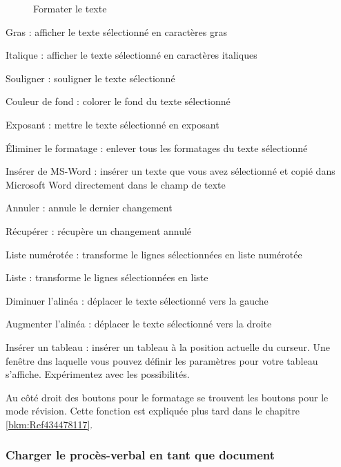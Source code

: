 \begin{figure}[H]
\caption{Formater le texte}
\end{figure}

\begin{compactitem}
\item Gras : afficher le texte sélectionné en caractères gras
\item Italique : afficher le texte sélectionné en caractères italiques
\item Souligner : souligner le texte sélectionné
\item Couleur de fond : colorer le fond du texte sélectionné 
\item Exposant : mettre le texte sélectionné en exposant
\item Éliminer le formatage : enlever tous les formatages du texte sélectionné
\item Insérer de MS-Word : insérer un texte que vous avez sélectionné et copié dans 
Microsoft Word directement dans le champ de texte
\item Annuler : annule le dernier changement
\item Récupérer : récupère un changement annulé
\item Liste numérotée : transforme le lignes sélectionnées 
en liste numérotée
\item Liste : transforme le lignes sélectionnées 
en liste
\item Diminuer l'alinéa : déplacer le texte sélectionné vers la gauche
\item Augmenter l'alinéa : déplacer le texte sélectionné vers la droite
\item Insérer un tableau : insérer un tableau à la position actuelle du curseur.
Une fenêtre dns laquelle vous pouvez définir les paramètres pour votre tableau s'affiche.
Expérimentez avec les possibilités.
\end{compactitem}

\vspace{\baselineskip}

\begin{sloppypar}
Au côté droit des boutons pour le formatage se trouvent les boutons pour le mode révision. Cette fonction est expliquée plus tard dans le chapitre \ref{bkm:Ref434478117}.
\end{sloppypar}

\pagebreak
\subsubsection{Charger le procès-verbal en tant que document}

